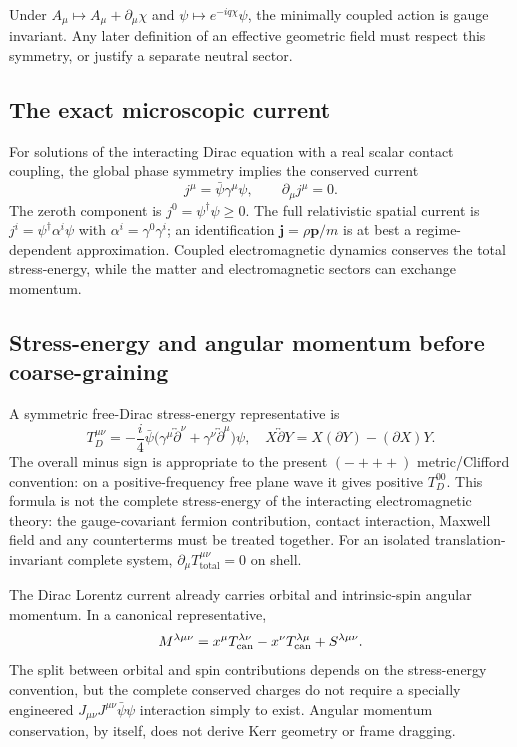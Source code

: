 \documentclass[11pt,a4paper]{article}
\begin{document}
Under $A_\mu\mapsto A_\mu+\partial_\mu\chi$ and $\psi\mapsto e^{-iq\chi}\psi$, the minimally coupled action is gauge invariant. Any later definition of an effective geometric field must respect this symmetry, or justify a separate neutral sector.

\subsection{The exact microscopic current}
For solutions of the interacting Dirac equation with a real scalar contact coupling, the global phase symmetry implies the conserved current
\begin{equation}\label{eq:current}
j^\mu=\bar\psi\gamma^\mu\psi,\qquad \partial_\mu j^\mu=0.
\end{equation}
The zeroth component is $j^0=\psi^\dagger\psi\geq0$. The full relativistic spatial current is $j^i=\psi^\dagger\alpha^i\psi$ with $\alpha^i=\gamma^0\gamma^i$; an identification $\bm j=\rho\bm p/m$ is at best a regime-dependent approximation. Coupled electromagnetic dynamics conserves the total stress-energy, while the matter and electromagnetic sectors can exchange momentum.

\subsection{Stress-energy and angular momentum before coarse-graining}
A symmetric free-Dirac stress-energy representative is
\begin{equation}\label{eq:freeT}
T_D^{\mu\nu}=-\frac{i}{4}\bar\psi\bigl(\gamma^\mu\overleftrightarrow{\partial}^{\nu}
+\gamma^\nu\overleftrightarrow{\partial}^{\mu}\bigr)\psi,
\quad X\overleftrightarrow{\partial}Y=X(\partial Y)-(\partial X)Y.
\end{equation}
The overall minus sign is appropriate to the present $(-+++)$ metric/Clifford convention: on a positive-frequency free plane wave it gives positive $T_D^{00}$. This formula is not the complete stress-energy of the interacting electromagnetic theory: the gauge-covariant fermion contribution, contact interaction, Maxwell field and any counterterms must be treated together. For an isolated translation-invariant complete system, $\partial_\mu T_{\mathrm{total}}^{\mu\nu}=0$ on shell.

The Dirac Lorentz current already carries orbital and intrinsic-spin angular momentum. In a canonical representative,
\begin{equation}\label{eq:angular}
M^{\lambda\mu\nu}=x^\mu T_{\rm can}^{\lambda\nu}-x^\nu T_{\rm can}^{\lambda\mu}
+S^{\lambda\mu\nu}.
\end{equation}
The split between orbital and spin contributions depends on the stress-energy convention, but the complete conserved charges do not require a specially engineered $J_{\mu\nu}J^{\mu\nu}\bar\psi\psi$ interaction simply to exist. Angular momentum conservation, by itself, does not derive Kerr geometry or frame dragging.
\end{document}
